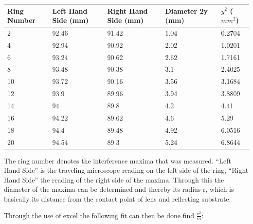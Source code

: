 \documentclass[12pt]{article}
\begin{document}
\begin{table}[H]
  \begin{tabular}{lllll}
  Ring Number & Left Hand Side (mm) & Right Hand Side (mm) & Diameter 2y (mm) & $y^2$ ($mm^2$) \\
  \hline
  2           & 92.46               & 91.42                & 1.04             & 0.2704                                       \\
  4           & 92.94               & 90.92                & 2.02             & 1.0201                                       \\
  6           & 93.24               & 90.62                & 2.62             & 1.7161                                       \\
  8           & 93.48               & 90.38                & 3.1              & 2.4025                                       \\
  10          & 93.72               & 90.16                & 3.56             & 3.1684                                       \\
  12          & 93.9                & 89.96                & 3.94             & 3.8809                                       \\
  14          & 94                  & 89.8                 & 4.2              & 4.41                                         \\
  16          & 94.22               & 89.62                & 4.6              & 5.29                                         \\
  18          & 94.4                & 89.48                & 4.92             & 6.0516                                       \\
  20          & 94.54               & 89.3                 & 5.24             & 6.8644                                      
  \end{tabular}
\end{table}

The ring number denotes the interference maxima that was measured. “Left Hand Side” is
the traveling microscope reading on the left side of the ring, “Right Hand Side”
the reading of the right side of the maxima. Through this the diameter of the maxima
can be determined and thereby its radius r, which is basically its distance from the
contact point of lens and reflecting substrate.

Through the use of excel the following fit can then be done find $\frac{r^2}{m}$:
\end{document}
